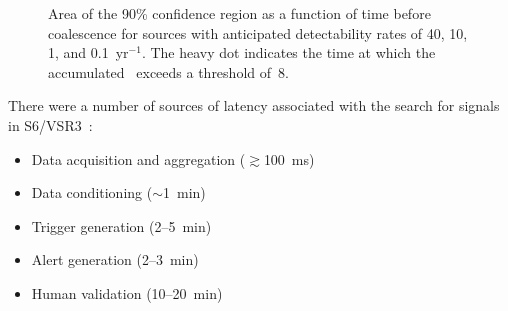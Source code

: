 \documentclass[portrait,plainboxedsections]{sciposter}
\begin{document}
\begin{minipage}[t]{0.25\textwidth}
\begin{figure}[h]
\caption{\label{fig:sky-localization-accuracy}Area of the 90\% confidence
region as a function of time before coalescence for sources with anticipated
detectability rates of 40, 10, 1, and 0.1~yr$^{-1}$. The heavy dot indicates
the time at which the accumulated \SNR\ exceeds a threshold of~8.}
\end{figure}

There were a number of sources of latency associated with the search for
\CBC{} signals in S6/VSR3~\cite{HugheyGWPAW2011}:

\begin{itemize}
\item Data acquisition and aggregation ($\gtrsim$100~ms)

\item Data conditioning ($\sim$1~min)

\item Trigger generation (2--5~min)

\item Alert generation (2--3~min)

\item Human validation (10--20~min)

\end{itemize}

\end{minipage}%
\hspace{0.05\textwidth}%
\end{document}
